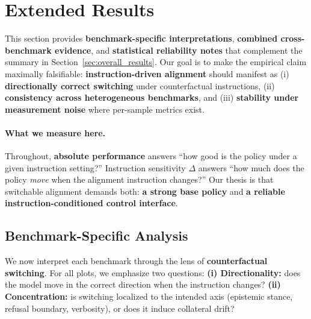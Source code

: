 
\section{Extended Results}
\label{sec:appendix_extended_results}

This section provides \textbf{benchmark-specific interpretations}, \textbf{combined cross-benchmark evidence}, and \textbf{statistical reliability notes} that complement the summary in Section~\ref{sec:overall_results}.
Our goal is to make the empirical claim maximally falsifiable:
\textbf{instruction-driven alignment} should manifest as (i) \textbf{directionally correct switching} under counterfactual instructions, (ii) \textbf{consistency across heterogeneous benchmarks}, and (iii) \textbf{stability under measurement noise} where per-sample metrics exist.

\vspace{-0.3em}
\paragraph{\textbf{What we measure here.}}
Throughout, \textbf{absolute performance} answers ``how good is the policy under a given instruction setting?''
Instruction sensitivity $\Delta$ answers ``how much does the policy \emph{move} when the alignment instruction changes?''
Our thesis is that switchable alignment demands both:
\textbf{a strong base policy} and \textbf{a reliable instruction-conditioned control interface}.

\vspace{-1mm}
\subsection{Benchmark-Specific Analysis}
\label{sec:benchmark_analysis}

We now interpret each benchmark through the lens of \textbf{counterfactual switching}.
For all plots, we emphasize two questions:
\textbf{(i) Directionality:} does the model move in the correct direction when the instruction changes?
\textbf{(ii) Concentration:} is switching localized to the intended axis (epistemic stance, refusal boundary, verbosity), or does it induce collateral drift?

